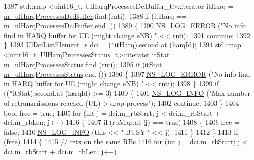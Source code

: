 \begin{DoxyCode}
1387               std::map <uint16\_t, UlHarqProcessesDciBuffer\_t>::iterator itHarq = 
      \hyperlink{classns3_1_1TdMtFfMacScheduler_a25c9425db7dae9dad47cd58ae3b70faf}{m\_ulHarqProcessesDciBuffer}.find (rnti);
1388               \textcolor{keywordflow}{if} (itHarq == \hyperlink{classns3_1_1TdMtFfMacScheduler_a25c9425db7dae9dad47cd58ae3b70faf}{m\_ulHarqProcessesDciBuffer}.end ())
1389                 \{
1390                   \hyperlink{group__logging_ga0261a8db1d4ac5f79417d117634fd455}{NS\_LOG\_ERROR} (\textcolor{stringliteral}{"No info find in HARQ buffer for UE (might change eNB) "} << 
      rnti);
1391                   \textcolor{keywordflow}{continue};
1392                 \}
1393               UlDciListElement\_s dci = (*itHarq).second.at (harqId);
1394               std::map <uint16\_t, UlHarqProcessesStatus\_t>::iterator itStat = 
      \hyperlink{classns3_1_1TdMtFfMacScheduler_a0a4599be9db713d937b6d524a8546f19}{m\_ulHarqProcessesStatus}.find (rnti);
1395               \textcolor{keywordflow}{if} (itStat == \hyperlink{classns3_1_1TdMtFfMacScheduler_a0a4599be9db713d937b6d524a8546f19}{m\_ulHarqProcessesStatus}.end ())
1396                 \{
1397                   \hyperlink{group__logging_ga0261a8db1d4ac5f79417d117634fd455}{NS\_LOG\_ERROR} (\textcolor{stringliteral}{"No info find in HARQ buffer for UE (might change eNB) "} << 
      rnti);
1398                 \}
1399               \textcolor{keywordflow}{if} ((*itStat).second.at (harqId) >= 3)
1400                 \{
1401                   \hyperlink{group__logging_gafbd73ee2cf9f26b319f49086d8e860fb}{NS\_LOG\_INFO} (\textcolor{stringliteral}{"Max number of retransmissions reached (UL)-> drop process"});
1402                   \textcolor{keywordflow}{continue};
1403                 \}
1404               \textcolor{keywordtype}{bool} free = \textcolor{keyword}{true};
1405               \textcolor{keywordflow}{for} (\textcolor{keywordtype}{int} j = dci.m\_rbStart; j < dci.m\_rbStart + dci.m\_rbLen; j++)
1406                 \{
1407                   \textcolor{keywordflow}{if} (rbMap.at (j) == \textcolor{keyword}{true})
1408                     \{
1409                       free = \textcolor{keyword}{false};
1410                       \hyperlink{group__logging_gafbd73ee2cf9f26b319f49086d8e860fb}{NS\_LOG\_INFO} (\textcolor{keyword}{this} << \textcolor{stringliteral}{" BUSY "} << j);
1411                     \}
1412                 \}
1413               \textcolor{keywordflow}{if} (free)
1414                 \{
1415                   \textcolor{comment}{// retx on the same RBs}
1416                   \textcolor{keywordflow}{for} (\textcolor{keywordtype}{int} j = dci.m\_rbStart; j < dci.m\_rbStart + dci.m\_rbLen; j++)

\end{DoxyCode}
